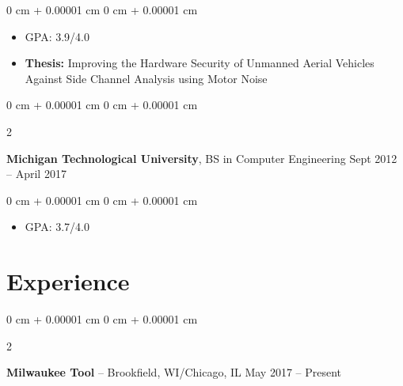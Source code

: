 \documentclass[10pt, letterpaper]{article}
\newenvironment{highlights}{
    \begin{itemize}[
        topsep=0.10 cm,
        parsep=0.10 cm,
        partopsep=0pt,
        itemsep=0pt,
        leftmargin=0 cm + 10pt
    ]
}{
    \end{itemize}
} %
\newenvironment{onecolentry}{
    \begin{adjustwidth}{
        0 cm + 0.00001 cm
    }{
        0 cm + 0.00001 cm
    }
}{
    \end{adjustwidth}
} %
\newenvironment{twocolentry}[2][]{
    \onecolentry
    \def\secondColumn{#2}
    \setcolumnwidth{\fill, 4.5 cm}
    \begin{paracol}{2}
}{
    \switchcolumn \raggedleft \secondColumn
    \end{paracol}
    \endonecolentry
} %
\begin{document}
        \vspace{0.10 cm}
        \begin{onecolentry}
            \begin{highlights}
                \item GPA: 3.9/4.0 
                \item \textbf{Thesis:} Improving the Hardware Security of Unmanned Aerial Vehicles Against Side Channel Analysis using Motor Noise 
            \end{highlights}
        \end{onecolentry}
        \vspace{0.2 cm}
        \begin{twocolentry}{
            Sept 2012 – April 2017
        }
            \textbf{Michigan Technological University}, BS in Computer Engineering\end{twocolentry}

        \vspace{0.10 cm}
        \begin{onecolentry}
            \begin{highlights}
                \item GPA: 3.7/4.0 
            \end{highlights}
        \end{onecolentry}
    
    \section{Experience}
        
        \begin{twocolentry}{
            May 2017 – Present
        }
            \textbf{Milwaukee Tool} -- Brookfield, WI/Chicago, IL\end{twocolentry}
\end{document}
